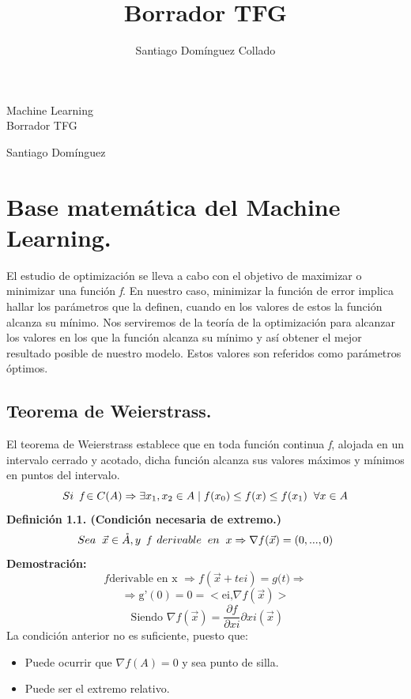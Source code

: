 \documentclass[a4paper,10pt]{article}
\author{Santiago Domínguez Collado}
\title{Borrador TFG}
\begin{document}
\begin{center}
\begin{LARGE}
Machine Learning \\
\vspace*{0.15in}
\UseRawInputEncoding
Borrador TFG
\end{LARGE}
\end{center}
\begin{center}
\begin{large}
Santiago Domínguez
\end{large}
\end{center}

\section{Base matemática del Machine Learning.}
\label{}

El estudio de optimización se lleva a cabo con el objetivo de maximizar o minimizar una función \textit{f}.
En nuestro caso, minimizar la función de error implica hallar los parámetros que la definen, cuando en los valores de estos la función alcanza su mínimo.
Nos serviremos de la teoría de la optimización para alcanzar los valores en los que la función alcanza su mínimo y así obtener el mejor resultado posible de nuestro modelo. Estos valores son referidos como parámetros óptimos.
\subsection{Teorema de Weierstrass.}

El teorema de Weierstrass establece que en toda función continua \textit{f}, alojada en un intervalo cerrado y acotado, dicha función alcanza sus valores máximos y mínimos en puntos del intervalo.
 \[Si \hspace{0.20cm} \textit{f} \in C(A) \Rightarrow \exists x_{1},x_{2} \in A \mid f(x_{0}) \leq f(x) \leq f(x_{1}) \hspace{0.20cm} \forall x \in A\] 
\textbf{Definición 1.1. (Condición necesaria de extremo.)}
\noindent
\[Sea \hspace{0.20cm} \vec{x} \in \mathring{A}, y\hspace{0.20cm} \textit{f}\hspace{0.20cm} derivable\hspace{0.20cm} en \hspace{0.20cm}x \Rightarrow \nabla f(\vec{x}) = (0,...,0)\]
\textbf{Demostración:} \[f \text{derivable en x } \Rightarrow f(\vec{x}+tei)=\textit{g(t)}\Rightarrow \] 
\[ \Rightarrow \text{g'} (0)=0= <\text{ei,} \nabla f(\vec{x}) >\] 
\[\text{ Siendo }  \nabla f(\vec{x})= \frac{\partial f}{\partial xi} \partial xi (\vec{x})\]
La condición anterior no es suficiente, puesto que:
\begin{itemize}
    \item Puede ocurrir que $\nabla f(A) = 0$ y sea punto de silla.
    \item Puede ser el extremo relativo.
\end{itemize}
\end{document}
